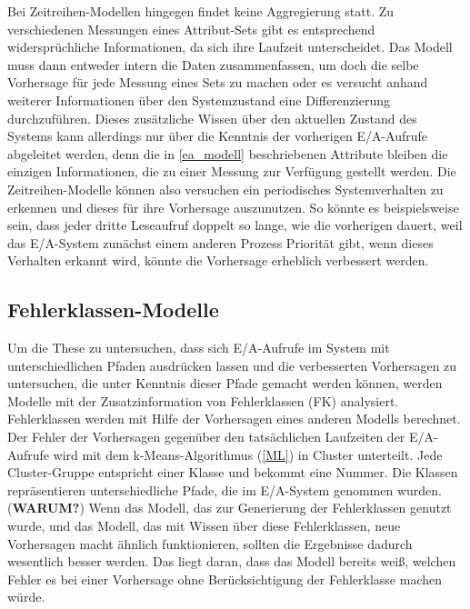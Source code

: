 \documentclass[
	12pt,
	a4paper,
	BCOR10mm,
	DIV14,
	listof=totoc,
	bibliography=totoc,
	headsepline
]{scrreprt}
\begin{document}
Bei Zeitreihen-Modellen hingegen findet keine Aggregierung statt. Zu verschiedenen Messungen eines Attribut-Sets gibt es entsprechend \glqq widersprüchliche\grqq{} Informationen, da sich ihre Laufzeit unterscheidet. Das Modell muss dann entweder intern die Daten zusammenfassen, um doch die selbe Vorhersage für jede Messung eines Sets zu machen oder es versucht anhand weiterer Informationen über den Systemzustand eine Differenzierung durchzuführen. Dieses zusätzliche Wissen über den aktuellen Zustand des Systems kann allerdings nur über die Kenntnis der vorherigen E/A-Aufrufe abgeleitet werden, denn die in \ref{ea_modell} beschriebenen Attribute bleiben die einzigen Informationen, die zu einer Messung zur Verfügung gestellt werden.
Die Zeitreihen-Modelle können also versuchen ein periodisches Systemverhalten zu erkennen und dieses für ihre Vorhersage auszunutzen. So könnte es beispielsweise sein, dass jeder dritte Leseaufruf doppelt so lange, wie die vorherigen dauert, weil das E/A-System zunächst einem anderen Prozess Priorität gibt, wenn dieses Verhalten erkannt wird, könnte die Vorhersage erheblich verbessert werden.

\subsection{Fehlerklassen-Modelle}
Um die These zu untersuchen, dass sich E/A-Aufrufe im System mit unterschiedlichen Pfaden ausdrücken lassen und die verbesserten Vorhersagen zu untersuchen, die unter Kenntnis dieser Pfade gemacht werden können, werden Modelle mit der Zusatzinformation von Fehlerklassen (FK) analysiert.
Fehlerklassen werden mit Hilfe der Vorhersagen eines anderen Modells berechnet. Der Fehler der Vorhersagen gegenüber den tatsächlichen Laufzeiten der E/A-Aufrufe wird mit dem k-Means-Algorithmus (\ref{ML}) in Cluster unterteilt. Jede Cluster-Gruppe entspricht einer Klasse und bekommt eine Nummer. 
Die Klassen repräsentieren unterschiedliche Pfade, die im E/A-System genommen wurden. (\textbf{WARUM?})
Wenn das Modell, das zur Generierung der Fehlerklassen genutzt wurde, und das Modell, das mit Wissen über diese Fehlerklassen, neue Vorhersagen macht ähnlich funktionieren, sollten die Ergebnisse dadurch wesentlich besser werden. Das liegt daran, dass das Modell bereits \glqq weiß\grqq{}, welchen Fehler es bei einer Vorhersage ohne Berücksichtigung der Fehlerklasse machen würde. 
\end{document}
